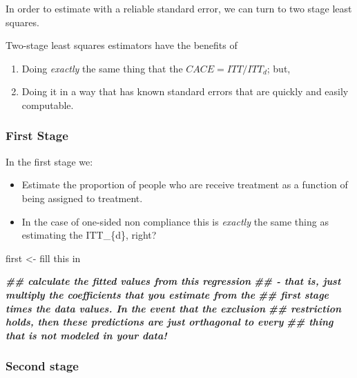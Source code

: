 \documentclass[
]{article}
\newenvironment{Shaded}{\begin{snugshade}}{\end{snugshade}}
\newcommand{\DocumentationTok}[1]{\textcolor[rgb]{0.56,0.35,0.01}{\textbf{\textit{#1}}}}
\newcommand{\NormalTok}[1]{#1}
\newcommand{\OtherTok}[1]{\textcolor[rgb]{0.56,0.35,0.01}{#1}}
\newcommand{\StringTok}[1]{\textcolor[rgb]{0.31,0.60,0.02}{#1}}
\providecommand{\tightlist}{%
  \setlength{\itemsep}{0pt}\setlength{\parskip}{0pt}}
\begin{document}
In order to estimate with a reliable standard error, we can turn to two stage least squares.

Two-stage least squares estimators have the benefits of

\begin{enumerate}
\def\labelenumi{\arabic{enumi}.}
\tightlist
\item
  Doing \emph{exactly} the same thing that the \(CACE = ITT / ITT_{d}\); but,
\item
  Doing it in a way that has known standard errors that are quickly and easily computable.
\end{enumerate}

\hypertarget{first-stage}{%
\subsubsection{First Stage}\label{first-stage}}

In the first stage we:

\begin{itemize}
\tightlist
\item
  Estimate the proportion of people who are receive treatment as a function of being assigned to treatment.
\item
  In the case of one-sided non compliance this is \emph{exactly} the same thing as estimating the
  ITT\_\{d\}, right?
\end{itemize}

\begin{Shaded}
\begin{Highlighting}[]
\NormalTok{first }\OtherTok{\textless{}{-}} \StringTok{\textquotesingle{}fill this in\textquotesingle{}}
\end{Highlighting}
\end{Shaded}

\begin{Shaded}
\begin{Highlighting}[]
\DocumentationTok{\#\# calculate the fitted values from this regression}
\DocumentationTok{\#\#   {-} that is, just multiply the coefficients that you estimate from the}
\DocumentationTok{\#\#     first stage times the data values. In the event that the exclusion}
\DocumentationTok{\#\#     restriction holds, then these predictions are just orthagonal to every}
\DocumentationTok{\#\#     thing that is not modeled in your data! }
\end{Highlighting}
\end{Shaded}

\hypertarget{second-stage}{%
\subsubsection{Second stage}\label{second-stage}}
\end{document}
